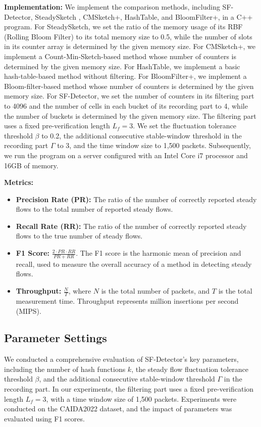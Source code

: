 \documentclass[preprint,12pt]{elsarticle}
\begin{document}
\textbf{Implementation:}
We implement the comparison methods, including SF-Detector, SteadySketch \cite{b23}, CMSketch+, HashTable, and BloomFilter+, in a C++ program. For SteadySketch, we set the ratio of the memory usage of its RBF (Rolling Bloom Filter) to its total memory size to 0.5, while the number of slots in its counter array is determined by the given memory size. For CMSketch+, we implement a Count-Min-Sketch-based method whose number of counters is determined by the given memory size. For HashTable, we implement a basic hash-table-based method without filtering. For BloomFilter+, we implement a Bloom-filter-based method whose number of counters is determined by the given memory size. For SF-Detector, we set the number of counters in its filtering part to 4096 and the number of cells in each bucket of its recording part to 4, while the number of buckets is determined by the given memory size. The filtering part uses a fixed pre-verification length $L_f=3$. We set the fluctuation tolerance threshold $\beta$ to 0.2, the additional consecutive stable-window threshold in the recording part $\Gamma$ to 3, and the time window size to 1,500 packets. Subsequently, we run the program on a server configured with an Intel Core i7 processor and 16GB of memory.

\textbf{Metrics:}
\begin{itemize}
    \item \textbf{Precision Rate (PR):} The ratio of the number of correctly reported steady flows to the total number of reported steady flows.
    \item \textbf{Recall Rate (RR):} The ratio of the number of correctly reported steady flows to the true number of steady flows.
    \item \textbf{F1 Score:} $\frac{2 \cdot PR \cdot RR}{PR + RR}$. The F1 score is the harmonic mean of precision and recall, used to measure the overall accuracy of a method in detecting steady flows.
    \item \textbf{Throughput:} $\frac{N}{T}$, where $N$ is the total number of packets, and $T$ is the total measurement time. Throughput represents million insertions per second (MIPS).
\end{itemize}

\subsection{Parameter Settings}
We conducted a comprehensive evaluation of SF-Detector's key parameters, including the number of hash functions $k$, the steady flow fluctuation tolerance threshold $\beta$, and the additional consecutive stable-window threshold $\Gamma$ in the recording part. In our experiments, the filtering part uses a fixed pre-verification length $L_f=3$, with a time window size of 1,500 packets. Experiments were conducted on the CAIDA2022 dataset, and the impact of parameters was evaluated using F1 scores.
\end{document}
